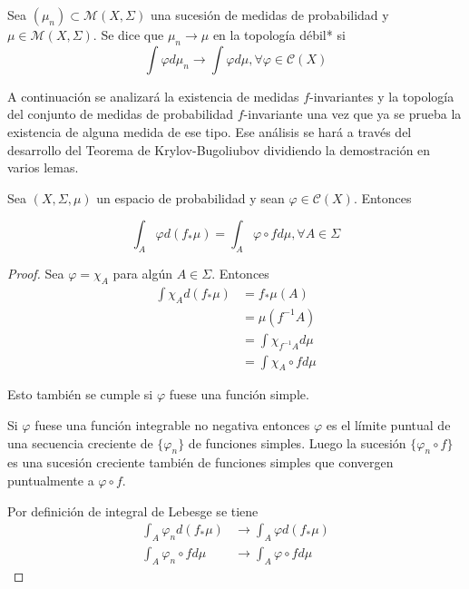 \begin{definicion}
	Sea $(\mu_n) \subset \mathcal{M}(X,\Sigma)$ una sucesión de medidas de probabilidad y $\mu \in \mathcal{M}(X,\Sigma)$. Se dice que $\mu_n \rightarrow \mu$ en la topología débil* si
	\begin{equation}
		\int \varphi d\mu_n \rightarrow \int \varphi d\mu, \forall \varphi \in \mathcal{C}(X)
	\end{equation}
\end{definicion}

A continuación se analizará la existencia de medidas $f$-invariantes y la topología del conjunto de medidas de probabilidad $f$-invariante una vez que ya se prueba la existencia de alguna medida de ese tipo. Ese análisis se hará a través del desarrollo del Teorema de Krylov-Bugoliubov dividiendo la demostración en varios lemas.

\begin{lema}\label{lema1_krylov-bugoliubov}
	Sea $(X,\Sigma,\mu)$ un espacio de probabilidad y sean $\varphi \in \mathcal{C}(X)$. Entonces
	
	\begin{equation}
		\int_A \varphi d(f_*\mu)=\int_A \varphi \circ f d\mu, \forall A \in \Sigma
	\end{equation}
\end{lema}

\begin{proof}
	Sea $\varphi = \chi_A$ para algún $A \in \Sigma$. Entonces
	\begin{align}
		\int \chi_A d(f_* \mu) &= f_* \mu(A)\\
		&= \mu(f^{-1} A)\\
		&= \int \chi_{f^{-1}A} d\mu\\
		&= \int \chi_A \circ f d\mu
	\end{align}
	
	Esto también se cumple si $\varphi$ fuese una función simple.
	
	Si $\varphi$ fuese una función integrable no negativa entonces $\varphi$ es el límite puntual de una secuencia creciente de $\{ \varphi_n \}$ de funciones simples. Luego la sucesión $\{ \varphi_n \circ f \}$ es una sucesión creciente también de funciones simples que convergen puntualmente a $\varphi \circ f$.
	
	Por definición de integral de Lebesge se tiene
	\begin{align}
		\int_A \varphi_n d(f_* \mu) &\rightarrow \int_A \varphi d(f_* \mu)\\
		\int_A \varphi_n \circ f d\mu &\rightarrow \int_A \varphi \circ f d\mu
	\end{align}
\end{proof}


